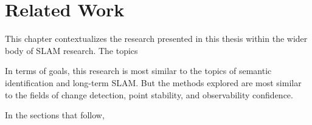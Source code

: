 \section{Related Work}
\label{sec:related_work}

This chapter contextualizes the research presented in this thesis within the wider body of SLAM research. The topics 

In terms of goals, this research is most similar to the topics of semantic identification and long-term SLAM. But the methods explored are most similar to the fields of change detection, point stability, and observability confidence.

In the sections that follow,
% 